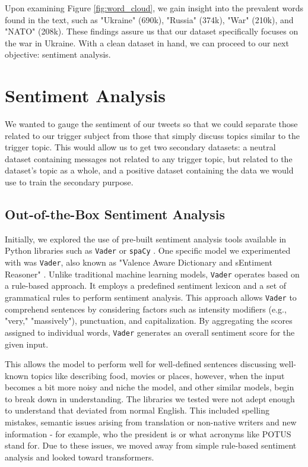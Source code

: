 Upon examining Figure \ref{fig:word_cloud}, we gain insight into the prevalent words found in the text, such as "Ukraine" (690k), "Russia" (374k), "War" (210k), and "NATO" (208k). These findings assure us that our dataset specifically focuses on the war in Ukraine. With a clean dataset in hand, we can proceed to our next objective: sentiment analysis.

\section{Sentiment Analysis}

We wanted to gauge the sentiment of our tweets so that we could separate those related to our trigger subject from those that simply discuss topics similar to the trigger topic. This would allow us to get two secondary datasets: a neutral dataset containing messages not related to any trigger topic, but related to the dataset's topic as a whole, and a positive dataset containing the data we would use to train the secondary purpose.

\subsection{Out-of-the-Box Sentiment Analysis}

Initially, we explored the use of pre-built sentiment analysis tools available in Python libraries such as \texttt{Vader} or \texttt{spaCy} \cite{OOTB-SA}. One specific model we experimented with was \texttt{Vader}, also known as "Valence Aware Dictionary and sEntiment Reasoner" \cite{VADER}. Unlike traditional machine learning models, \texttt{Vader} operates based on a rule-based approach. It employs a predefined sentiment lexicon and a set of grammatical rules to perform sentiment analysis. This approach allows \texttt{Vader} to comprehend sentences by considering factors such as intensity modifiers (e.g., "very," "massively"), punctuation, and capitalization. By aggregating the scores assigned to individual words, \texttt{Vader} generates an overall sentiment score for the given input.

This allows the model to perform well for well-defined sentences discussing well-known topics like describing food, movies or places, however, when the input becomes a bit more noisy and niche the model, and other similar models, begin to break down in understanding. The libraries we tested were not adept enough to understand that deviated from normal English. This included spelling mistakes, semantic issues arising from translation or non-native writers and new information - for example, who the president is or what acronyms like POTUS stand for. Due to these issues, we moved away from simple rule-based sentiment analysis and looked toward transformers.

